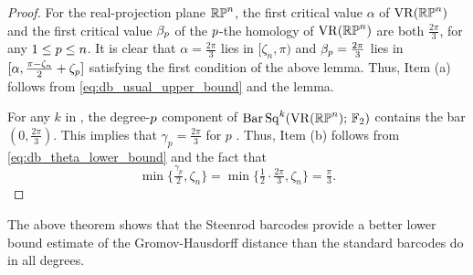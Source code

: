 \begin{proof}
        For the real-projection plane $\mathbb{RP}^n$, the first critical value $\alpha$ of $\operatorname{VR}(\mathbb{RP}^n)$ and the first critical value $\beta_p$ of the $p$-the homology of $\operatorname{VR}(\mathbb{RP}^n)$ are both $\tfrac{2\pi}{3}$, for any $1 \leq p \leq n$. %
        It is clear that $\alpha= \tfrac{2\pi}{3}$ lies in $[\zeta_n, \pi)$ and $\beta_p = \tfrac{2\pi}{3}$ lies in $[\alpha, \tfrac{\pi - \zeta_n}{2}+\zeta_p]$ satisfying the first condition of the above lemma. 
        Thus, Item (a) follows from \cref{eq:db_usual_upper_bound} and the lemma.

        For any $k$ in , the degree-$p$ component of $\operatorname{Bar}\operatorname{Sq}^{k}(\operatorname{VR}(\mathbb{RP}^n);\,{\mathbb{F}_2})$ contains the bar $(0,\tfrac{2\pi}{3})$. 
        This implies that $\gamma_p =\tfrac{2\pi}{3}$ for $p$ . 
        Thus, Item (b) follows from \cref{eq:db_theta_lower_bound} and the fact that
        \[\min\{\tfrac{\gamma_p}{2}, \zeta_n\} = \min\{\tfrac{1}{2}\cdot\tfrac{2\pi}{3}, \zeta_n\} = \tfrac{\pi}{3}.\]
\end{proof}

The above theorem shows that the Steenrod barcodes provide a better lower bound estimate of the Gromov-Hausdorff distance than the standard barcodes do in all degrees.
